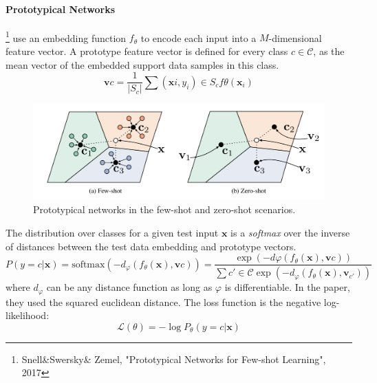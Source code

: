 \documentclass[main]{subfiles}
\begin{document}
\paragraph{Prototypical Networks}\footnote{Snell\&Swersky\& Zemel, "Prototypical Networks for Few-shot Learning", 2017} use an embedding function $f_\theta$ to encode each input into a $M$-dimensional feature vector. A prototype feature vector is defined for every class $c \in \mathcal{C}$, as the mean vector of the embedded support data samples in this class.
\begin{equation}
    \mathbf{v}c = \frac{1}{|S_c|} \sum{(\mathbf{x}i, y_i) \in S_c} f\theta(\mathbf{x}_i)
\end{equation}
\begin{figure}[H]
    \centering
    \includegraphics[width=0.60\linewidth]{14_ContinualMetaAndTransferLearning/figures/prototypical_networks.png}
    \caption{Prototypical networks in the few-shot and zero-shot scenarios.}
    \label{fig:my_label}
\end{figure}
The distribution over classes for a given test input $\mathbf{x}$ is a \textit{softmax} over the inverse of distances between the test data embedding and prototype vectors.
\begin{equation}
    P(y=c\vert\mathbf{x})=\text{softmax}(-d_\varphi(f_\theta(\mathbf{x}), \mathbf{v}c)) = \frac{\exp(-d\varphi(f_\theta(\mathbf{x}), \mathbf{v}c))}{\sum{c' \in \mathcal{C}}\exp(-d_\varphi(f_\theta(\mathbf{x}), \mathbf{v}_{c'}))}
\end{equation}
where $d_\varphi$ can be any distance function as long as $\varphi$ is differentiable. In the paper, they used the squared euclidean distance. The loss function is the negative log-likelihood: 
\begin{equation}
    \mathcal{L}(\theta) = -\log P_\theta(y=c\vert\mathbf{x})
\end{equation}
\end{document}
